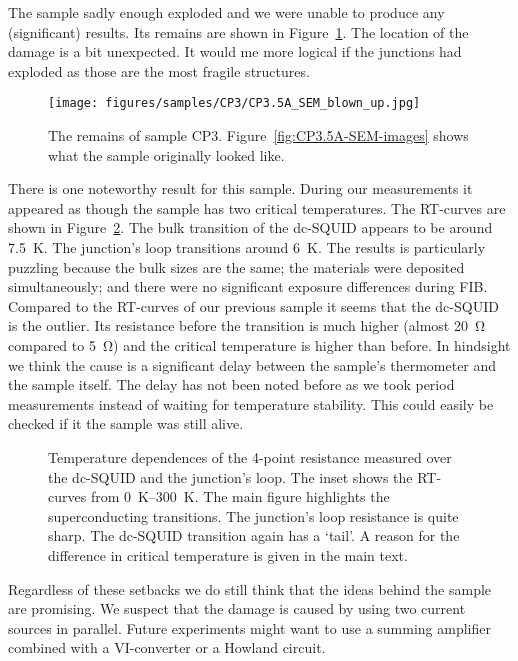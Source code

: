 The sample sadly enough exploded and we were unable to produce any (significant) results. Its remains are shown in Figure~\ref{fig:CP3.5A-remains}. The location of the damage is a bit unexpected. It would me more logical if the junctions had exploded as those are the most fragile structures.

\begin{figure}[ht!]	
	\centering
	\texttt{[image: figures/samples/CP3/CP3.5A\_SEM\_blown\_up.jpg]}
	\caption{The remains of sample CP3. Figure~\ref{fig:CP3.5A-SEM-images} shows what the sample originally looked like.}
	\label{fig:CP3.5A-remains}
\end{figure}

There is one noteworthy result for this sample. During our measurements it appeared as though the sample has two critical temperatures. The RT-curves are shown in Figure~\ref{fig:CP3.5A_RT_curves}. The bulk transition of the dc-SQUID appears to be around \qty{7.5}{\kelvin}. The junction's loop transitions around \qty{6}{\kelvin}. The results is particularly puzzling because the bulk sizes are the same; the materials were deposited simultaneously; and there were no significant exposure differences during FIB. Compared to the RT-curves of our previous sample it seems that the dc-SQUID is the outlier. Its resistance before the transition is much higher (almost \qty{20}{\ohm} compared to \qty{5}{\ohm}) and the critical temperature is higher than before. In hindsight we think the cause is a significant delay between the sample's thermometer and the sample itself. The delay has not been noted before as we took period measurements instead of waiting for temperature stability. This could easily be checked if it the sample was still alive.

\begin{figure}[ht!]
	\centering
	
	\caption{Temperature dependences of the 4-point resistance measured over the dc-SQUID and the junction's loop. The inset shows the RT-curves from \qtyrange{0}{300}{\kelvin}. The main figure highlights the superconducting transitions. The junction's loop resistance is quite sharp. The dc-SQUID transition again has a `tail'. A reason for the difference in critical temperature is given in the main text.}
	\label{fig:CP3.5A_RT_curves}
\end{figure}

Regardless of these setbacks we do still think that the ideas behind the sample are promising. We suspect that the damage is caused by using two current sources in parallel. Future experiments might want to use a summing amplifier combined with a VI-converter or a Howland circuit.